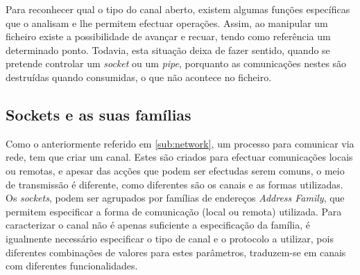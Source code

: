 
Para reconhecer qual o tipo do canal aberto, existem algumas funções específicas que o analisam e lhe permitem efectuar operações.
Assim, ao manipular um ficheiro existe a possibilidade de avançar e recuar, tendo como referência um determinado ponto.
Todavia, esta situação deixa de fazer sentido, quando se pretende controlar um \textit{socket} ou um \textit{pipe}, porquanto as comunicações nestes são destruídas quando consumidas, o que não acontece no ficheiro.
 




\subsection{Sockets e as suas famílias}
\label{sub:sockets}



Como o anteriormente referido em \ref{sub:network}, um processo para comunicar via rede, tem que criar um canal.
Estes são criados para efectuar comunicações locais ou remotas, e apesar das acções que podem ser efectudas serem comuns, o meio de transmissão é diferente, como diferentes são os canais e as formas utilizadas.
Os \textit{sockets}, podem ser agrupados por famílias de endereços \textit{Address Family}, que permitem especificar a forma de comunicação (local ou remota) utilizada.
Para caracterizar o canal não é apenas suficiente a especificação da família, é igualmente necessário especificar o tipo de canal e o protocolo a utilizar, pois diferentes combinações de valores para estes parâmetros, traduzem-se em canais com diferentes funcionalidades.

